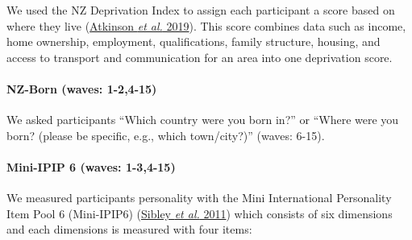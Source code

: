 \documentclass[
  singlecolumn,
  9pt]{article}
\let\oldparagraph\paragraph
\renewcommand{\paragraph}[1]{\oldparagraph{#1}\mbox{}}
\begin{document}
We used the NZ Deprivation Index to assign each participant a score
based on where they live (\hyperref[ref-atkinson2019]{Atkinson \emph{et
al.} 2019}). This score combines data such as income, home ownership,
employment, qualifications, family structure, housing, and access to
transport and communication for an area into one deprivation score.

\paragraph{NZ-Born (waves: 1-2,4-15)}\label{nz-born-waves-1-24-15}

We asked participants ``Which country were you born in?'' or ``Where
were you born? (please be specific, e.g., which town/city?)'' (waves:
6-15).

\paragraph{Mini-IPIP 6 (waves:
1-3,4-15)}\label{mini-ipip-6-waves-1-34-15}

We measured participants personality with the Mini International
Personality Item Pool 6 (Mini-IPIP6) (\hyperref[ref-sibley2011]{Sibley
\emph{et al.} 2011}) which consists of six dimensions and each
dimensions is measured with four items:
\end{document}
